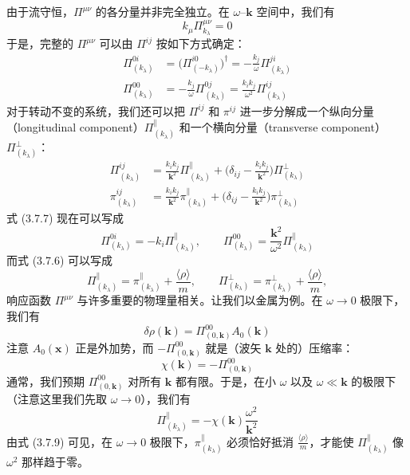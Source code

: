 由于流守恒，$\Pi^{\mu\nu}$ 的各分量并非完全独立。在 $\omega$--$\pmb{k}$ 空间中，我们有
\begin{equation*}
k_\mu\Pi^{\mu\nu}_{k_\lambda}=0
\end{equation*}
于是，完整的 $\Pi^{\mu\nu}$ 可以由 $\Pi^{ij}$ 按如下方式确定：
\begin{align*}
\Pi^{0i}_{(k_\lambda)}&=\big(\Pi^{i0}_{(-k_\lambda)}\big)^\dagger=-\frac{k_j}{\omega}\Pi^{ji}_{(k_\lambda)}\\
\Pi^{00}_{(k_\lambda)}&=-\frac{k_j}{\omega}\Pi^{0j}_{(k_\lambda)}=\frac{k_ik_j}{\omega^2}\Pi^{ij}_{(k_\lambda)} \tag{3.7.7}
\end{align*}
对于转动不变的系统，我们还可以把 $\Pi^{ij}$ 和 $\pi^{ij}$ 进一步分解成一个纵向分量（longitudinal component）$\Pi^{\parallel}_{(k_\lambda)}$ 和一个横向分量（transverse component）$\Pi^{\perp}_{(k_\lambda)}$：
\begin{align*}
\Pi^{ij}_{(k_\lambda)}&=\frac{k_ik_j}{\pmb{k}^2}\Pi^{\parallel}_{(k_\lambda)}+\Big(\delta_{ij}-\frac{k_ik_j}{\pmb{k}^2}\Big)\Pi^{\perp}_{(k_\lambda)}\\
\pi^{ij}_{(k_\lambda)}&=\frac{k_ik_j}{\pmb{k}^2}\pi^{\parallel}_{(k_\lambda)}+\Big(\delta_{ij}-\frac{k_ik_j}{\pmb{k}^2}\Big)\pi^{\perp}_{(k_\lambda)} \tag{3.7.8}
\end{align*}
式 (3.7.7) 现在可以写成
\begin{equation*}
\Pi^{0i}_{(k_\lambda)}=-k_i\Pi^{\parallel}_{(k_\lambda)},\qquad \Pi^{00}_{(k_\lambda)}=\frac{\pmb{k}^2}{\omega^2}\Pi^{\parallel}_{(k_\lambda)}
\end{equation*}
而式 (3.7.6) 可以写成
\begin{equation*}
\Pi^{\parallel}_{(k_\lambda)}=\pi^{\parallel}_{(k_\lambda)}+\frac{\langle\rho\rangle}{m},\qquad \Pi^{\perp}_{(k_\lambda)}=\pi^{\perp}_{(k_\lambda)}+\frac{\langle\rho\rangle}{m}, \tag{3.7.9}
\end{equation*}
响应函数 $\Pi^{\mu\nu}$ 与许多重要的物理量相关。让我们以金属为例。在 $\omega\to0$ 极限下，我们有
\begin{equation*}
\delta\rho(\pmb{k})=\Pi^{00}_{(0,\pmb{k})}A_0(\pmb{k})
\end{equation*}
注意 $A_0(\pmb{x})$ 正是外加势，而 $-\Pi^{00}_{(0,\pmb{k})}$ 就是（波矢 $\pmb{k}$ 处的）压缩率：
\begin{equation*}
\chi(\pmb{k})=-\Pi^{00}_{(0,\pmb{k})}
\end{equation*}
通常，我们预期 $\Pi^{00}_{(0,\pmb{k})}$ 对所有 $\pmb{k}$ 都有限。于是，在小 $\omega$ 以及 $\omega\ll\pmb{k}$ 的极限下（注意这里我们先取 $\omega\to0$），我们有
\begin{equation*}
\Pi^{\parallel}_{(k_\lambda)}=-\chi(\pmb{k})\frac{\omega^2}{\pmb{k}^2}
\end{equation*}
由式 (3.7.9) 可见，在 $\omega\to0$ 极限下，$\pi^{\parallel}_{(k_\lambda)}$ 必须恰好抵消 $\frac{\langle\rho\rangle}{m}$，才能使 $\Pi^{\parallel}_{(k_\lambda)}$ 像 $\omega^2$ 那样趋于零。

